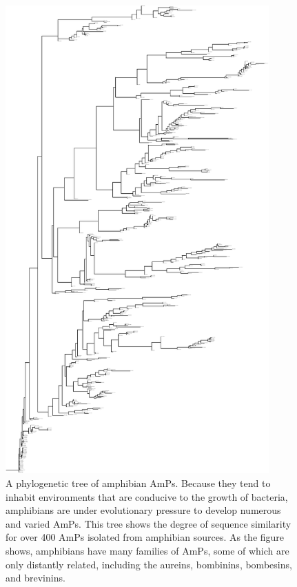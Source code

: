         \begin{figure}
        \begin{center}
        \includegraphics[angle=270,width=0.9\textwidth]{Body/Images-chap2/frog-amps.pdf}
        \end{center}
        \caption[A phylogenetic tree of amphibian antimicrobial peptides]{
            A phylogenetic tree of amphibian AmPs.  Because they
            tend to inhabit environments that are conducive to the
            growth of bacteria, amphibians are under evolutionary
            pressure to develop numerous and varied AmPs.  This tree
            shows the degree of sequence similarity for over 400
            AmPs isolated from amphibian sources.  As the figure
            shows, amphibians have many families of AmPs, some of
            which are only distantly related, including the aureins,
            bombinins, bombesins, and brevinins.
        }
        \label{fig:frogAmps}
        \end{figure}

